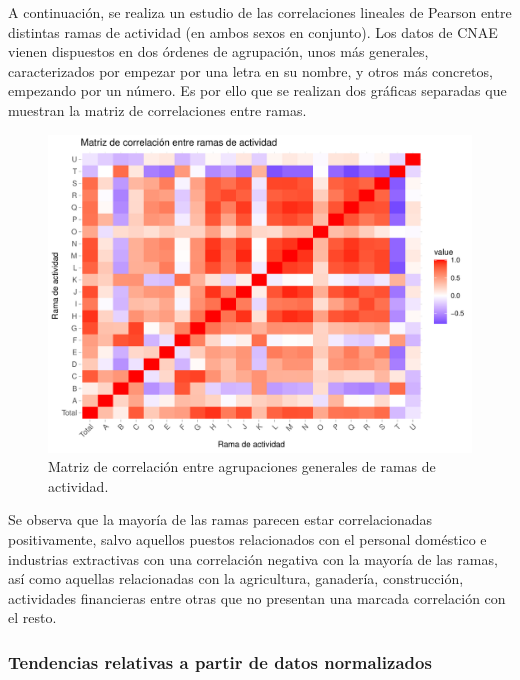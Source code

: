 \documentclass[Universitat de
València,article,submit,moreauthors,pdftex]{Definitions/mdpi}
\begin{document}
A continuación, se realiza un estudio de las correlaciones lineales de
Pearson entre distintas ramas de actividad (en ambos sexos en conjunto).
Los datos de CNAE vienen dispuestos en dos órdenes de agrupación, unos
más generales, caracterizados por empezar por una letra en su nombre, y
otros más concretos, empezando por un número. Es por ello que se
realizan dos gráficas separadas que muestran la matriz de correlaciones
entre ramas.

\begin{figure}

{\centering \includegraphics{ProyectoAED2024_files/figure-latex/unnamed-chunk-40-1} 

}

\caption{Matriz de correlación entre agrupaciones generales de ramas de actividad.}\label{fig:unnamed-chunk-40}
\end{figure}

Se observa que la mayoría de las ramas parecen estar correlacionadas
positivamente, salvo aquellos puestos relacionados con el personal
doméstico e industrias extractivas con una correlación negativa con la
mayoría de las ramas, así como aquellas relacionadas con la agricultura,
ganadería, construcción, actividades financieras entre otras que no
presentan una marcada correlación con el resto.

\subsubsection{\texorpdfstring{\textbf{Tendencias relativas a partir de
datos
normalizados}}{Tendencias relativas a partir de datos normalizados}}\label{tendencias-relativas-a-partir-de-datos-normalizados}
\end{document}
